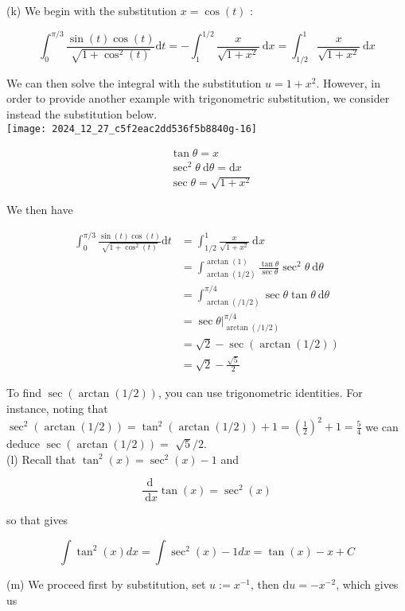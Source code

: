 \documentclass[10pt]{article}
\begin{document}
(k) We begin with the substitution $x=\cos (t)$ :

$$
\int_{0}^{\pi / 3} \frac{\sin (t) \cos (t)}{\sqrt{1+\cos ^{2}(t)}} \mathrm{d} t=-\int_{1}^{1 / 2} \frac{x}{\sqrt{1+x^{2}}} \mathrm{~d} x=\int_{1 / 2}^{1} \frac{x}{\sqrt{1+x^{2}}} \mathrm{~d} x
$$

We can then solve the integral with the substitution $u=1+x^{2}$. However, in order to provide another example with trigonometric substitution, we consider instead the substitution below.\\
\texttt{[image: 2024\_12\_27\_c5f2eac2dd536f5b8840g-16]}

$$
\begin{aligned}
& \tan \theta=x \\
& \sec ^{2} \theta \mathrm{~d} \theta=\mathrm{d} x \\
& \sec \theta=\sqrt{1+x^{2}}
\end{aligned}
$$

We then have

$$
\begin{aligned}
\int_{0}^{\pi / 3} \frac{\sin (t) \cos (t)}{\sqrt{1+\cos ^{2}(t)}} \mathrm{d} t & =\int_{1 / 2}^{1} \frac{x}{\sqrt{1+x^{2}}} \mathrm{~d} x \\
& =\int_{\arctan (1 / 2)}^{\arctan (1)} \frac{\tan \theta}{\sec \theta} \sec ^{2} \theta \mathrm{~d} \theta \\
& =\int_{\arctan (/ 1 / 2)}^{\pi / 4} \sec \theta \tan \theta \mathrm{~d} \theta \\
& =\left.\sec \theta\right|_{\arctan (/ 1 / 2)} ^{\pi / 4} \\
& =\sqrt{2}-\sec (\arctan (1 / 2)) \\
& =\sqrt{2}-\frac{\sqrt{5}}{2}
\end{aligned}
$$

To find $\sec (\arctan (1 / 2))$, you can use trigonometric identities. For instance, noting that $\sec ^{2}(\arctan (1 / 2))=\tan ^{2}(\arctan (1 / 2))+1=\left(\frac{1}{2}\right)^{2}+1=\frac{5}{4}$ we can deduce $\sec (\arctan (1 / 2))=$ $\sqrt{5} / 2$.\\
(l) Recall that $\tan ^{2}(x)=\sec ^{2}(x)-1$ and

$$
\frac{\mathrm{d}}{\mathrm{~d} x} \tan (x)=\sec ^{2}(x)
$$

so that gives

$$
\int \tan ^{2}(x) d x=\int \sec ^{2}(x)-1 d x=\tan (x)-x+C
$$

(m) We proceed first by substitution, set $u:=x^{-1}$, then $\mathrm{d} u=-x^{-2}$, which gives us
\end{document}
